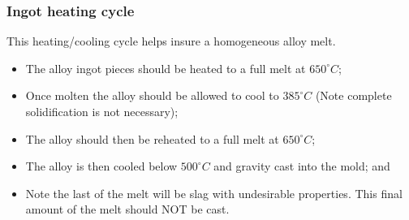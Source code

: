\subsubsection{Ingot heating cycle}

This heating/cooling cycle helps insure a homogeneous alloy melt.
\begin{itemize}
\item The \MgZnCa alloy ingot pieces should be heated to a full melt at $650^{\circ}C$;
\item Once molten the alloy should be allowed to cool to $385^{\circ}C$ (Note complete solidification is not necessary);
\item The alloy should then be reheated to a full melt at $650^{\circ}C$;
\item The alloy is then cooled below $500^{\circ}C$ and gravity cast into the mold; and
\item Note the last of the melt will be slag with undesirable properties. This final amount of the melt should NOT be cast.
\end{itemize}